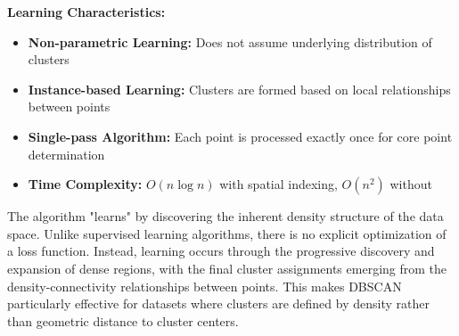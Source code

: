 \documentclass[a4paper, 11pt]{article}
\begin{document}
\textbf{Learning Characteristics:}
\begin{itemize}
    \item \textbf{Non-parametric Learning:} Does not assume underlying distribution of clusters
    \item \textbf{Instance-based Learning:} Clusters are formed based on local relationships between points
    \item \textbf{Single-pass Algorithm:} Each point is processed exactly once for core point determination
    \item \textbf{Time Complexity:} $O(n \log n)$ with spatial indexing, $O(n^2)$ without
\end{itemize}

The algorithm "learns" by discovering the inherent density structure of the data space. Unlike supervised learning algorithms, there is no explicit optimization of a loss function. Instead, learning occurs through the progressive discovery and expansion of dense regions, with the final cluster assignments emerging from the density-connectivity relationships between points. This makes DBSCAN particularly effective for datasets where clusters are defined by density rather than geometric distance to cluster centers.
\end{document}
